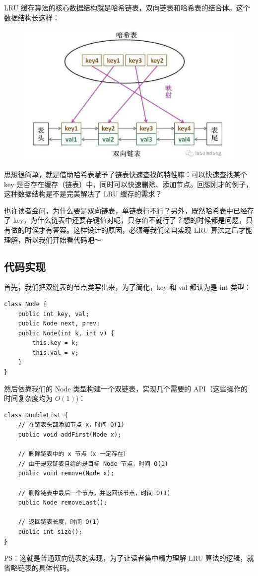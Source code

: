 \documentclass[12pt]{article}
\begin{document}
LRU 缓存算法的核心数据结构就是哈希链表，双向链表和哈希表的结合体。这个数据结构长这样：
\begin{figure}[H]
    \centering
    \includegraphics[width=1\textwidth]{fig/LRU_1.png}
\end{figure}

思想很简单，就是借助哈希表赋予了链表快速查找的特性嘛：可以快速查找某个 key 是否存在缓存（链表）中，同时可以快速删除、添加节点。回想刚才的例子，这种数据结构是不是完美解决了 LRU 缓存的需求？

也许读者会问，为什么要是双向链表，单链表行不行？另外，既然哈希表中已经存了 key，为什么链表中还要存键值对呢，只存值不就行了？想的时候都是问题，只有做的时候才有答案。这样设计的原因，必须等我们亲自实现 LRU 算法之后才能理解，所以我们开始看代码吧～

\subsection{代码实现}
首先，我们把双链表的节点类写出来，为了简化，key 和 val 都认为是 int 类型：
\begin{lstlisting}
class Node {
    public int key, val;
    public Node next, prev;
    public Node(int k, int v) {
        this.key = k;
        this.val = v;
    }
}
\end{lstlisting}

然后依靠我们的 Node 类型构建一个双链表，实现几个需要的 API（这些操作的时间复杂度均为 $O(1)$)：
\begin{lstlisting}
class DoubleList {  
    // 在链表头部添加节点 x，时间 O(1)
    public void addFirst(Node x);

    // 删除链表中的 x 节点（x 一定存在）
    // 由于是双链表且给的是目标 Node 节点，时间 O(1)
    public void remove(Node x);
    
    // 删除链表中最后一个节点，并返回该节点，时间 O(1)
    public Node removeLast();
    
    // 返回链表长度，时间 O(1)
    public int size();
}
\end{lstlisting}
PS：这就是普通双向链表的实现，为了让读者集中精力理解 LRU 算法的逻辑，就省略链表的具体代码。
\end{document}
